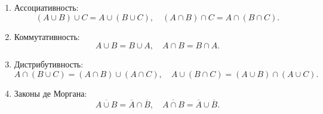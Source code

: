 \documentclass{article}
\begin{document}
\begin{enumerate}[label=\arabic*)]
  \item Ассоциативность:
    \[
      (A\cup B)\cup C = A\cup(B\cup C), 
      \quad (A\cap B)\cap C = A\cap(B\cap C).
    \]
  \item Коммутативность:
    \[
      A\cup B = B\cup A, 
      \quad A\cap B = B\cap A.
    \]
  \item Дистрибутивность:
    \[
      A\cap (B\cup C) = (A\cap B)\cup (A\cap C),
      \quad A\cup (B\cap C) = (A\cup B)\cap (A\cup C).
    \]
  \item Законы де Моргана:
    \[
      \overline{A\cup B} = \overline{A}\cap\overline{B},
      \quad \overline{A\cap B} = \overline{A}\cup\overline{B}.
    \]
\end{enumerate}
\end{document}
